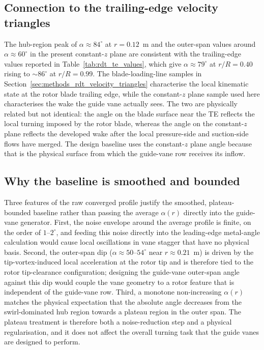 \subsection{Connection to the trailing-edge velocity triangles}
 
The hub-region peak of $\alpha\approx 84^\circ$ at $r=0.12$~m and the
outer-span values around $\alpha\approx 60^\circ$ in the present
constant-$z$ plane are consistent with the trailing-edge values
reported in Table~\ref{tab:rdt_te_values}, which give
$\alpha\approx 79^\circ$ at $r/R=0.40$ rising to $\sim 86^\circ$ at
$r/R=0.99$. The blade-loading-line samples in
Section~\ref{sec:methods_rdt_velocity_triangles} characterise the local
kinematic state at the rotor blade trailing edge, while the
constant-$z$ plane sample used here characterises the wake the guide
vane actually sees. The two are physically related but not identical:
the angle on the blade surface near the TE reflects the local turning
imposed by the rotor blade, whereas the angle on the constant-$z$
plane reflects the developed wake after the local pressure-side and
suction-side flows have merged. The design baseline uses the
constant-$z$ plane angle because that is the physical surface from
which the guide-vane row receives its inflow.
 
\subsection{Why the baseline is smoothed and bounded}
 
Three features of the raw converged profile justify the smoothed,
plateau-bounded baseline rather than passing the average $\alpha(r)$
directly into the guide-vane generator. First, the noise envelope
around the average profile is finite, on the order of $1$--$2^\circ$,
and feeding this noise directly into the leading-edge metal-angle
calculation would cause local oscillations in vane stagger that have no
physical basis. Second, the outer-span dip
($\alpha\approx 50$--$54^\circ$ near $r\approx 0.21$~m) is driven by
the tip-vortex-induced local acceleration at the rotor tip and is
therefore tied to the rotor tip-clearance configuration; designing the
guide-vane outer-span angle against this dip would couple the vane
geometry to a rotor feature that is independent of the guide-vane row.
Third, a monotone non-increasing $\alpha(r)$ matches the physical
expectation that the absolute angle decreases from the swirl-dominated
hub region towards a plateau region in the outer span. The plateau
treatment is therefore both a noise-reduction step and a physical
regularisation, and it does not affect the overall turning task that
the guide vanes are designed to perform.
 
